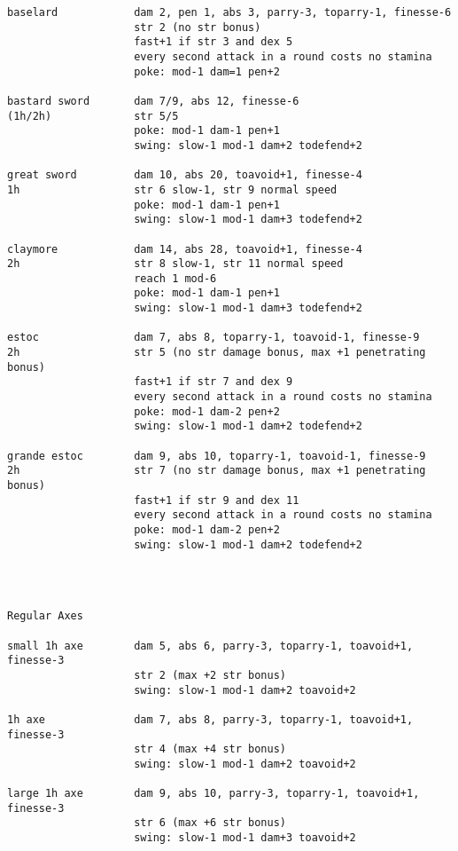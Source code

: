 \begin{verbatim}
baselard            dam 2, pen 1, abs 3, parry-3, toparry-1, finesse-6
                    str 2 (no str bonus)
                    fast+1 if str 3 and dex 5
                    every second attack in a round costs no stamina
                    poke: mod-1 dam=1 pen+2

bastard sword       dam 7/9, abs 12, finesse-6
(1h/2h)             str 5/5
                    poke: mod-1 dam-1 pen+1
                    swing: slow-1 mod-1 dam+2 todefend+2

great sword         dam 10, abs 20, toavoid+1, finesse-4
1h                  str 6 slow-1, str 9 normal speed
                    poke: mod-1 dam-1 pen+1
                    swing: slow-1 mod-1 dam+3 todefend+2

claymore            dam 14, abs 28, toavoid+1, finesse-4
2h                  str 8 slow-1, str 11 normal speed
                    reach 1 mod-6
                    poke: mod-1 dam-1 pen+1
                    swing: slow-1 mod-1 dam+3 todefend+2

estoc               dam 7, abs 8, toparry-1, toavoid-1, finesse-9
2h                  str 5 (no str damage bonus, max +1 penetrating bonus)
                    fast+1 if str 7 and dex 9
                    every second attack in a round costs no stamina
                    poke: mod-1 dam-2 pen+2
                    swing: slow-1 mod-1 dam+2 todefend+2

grande estoc        dam 9, abs 10, toparry-1, toavoid-1, finesse-9
2h                  str 7 (no str damage bonus, max +1 penetrating bonus)
                    fast+1 if str 9 and dex 11
                    every second attack in a round costs no stamina
                    poke: mod-1 dam-2 pen+2
                    swing: slow-1 mod-1 dam+2 todefend+2




\end{verbatim} \goodbreak \begin{verbatim}
Regular Axes

small 1h axe        dam 5, abs 6, parry-3, toparry-1, toavoid+1, finesse-3
                    str 2 (max +2 str bonus)
                    swing: slow-1 mod-1 dam+2 toavoid+2

1h axe              dam 7, abs 8, parry-3, toparry-1, toavoid+1, finesse-3
                    str 4 (max +4 str bonus)
                    swing: slow-1 mod-1 dam+2 toavoid+2

large 1h axe        dam 9, abs 10, parry-3, toparry-1, toavoid+1, finesse-3
                    str 6 (max +6 str bonus)
                    swing: slow-1 mod-1 dam+3 toavoid+2


\end{verbatim}
